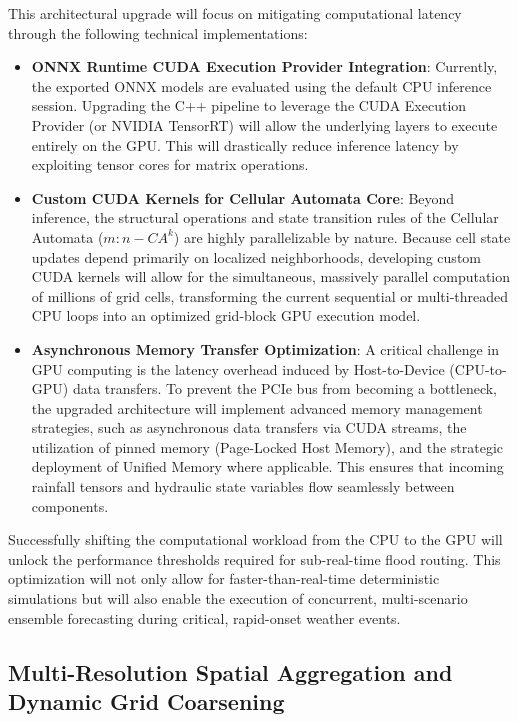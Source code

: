 This architectural upgrade will focus on mitigating computational latency through the following technical implementations:

\begin{itemize}
	\item \textbf{ONNX Runtime CUDA Execution Provider Integration}: Currently, the exported ONNX models are evaluated using 
	the default CPU inference session. Upgrading the C++ pipeline to leverage the CUDA Execution Provider (or NVIDIA TensorRT) 
	will allow the underlying layers to execute entirely on the GPU. This will drastically reduce inference latency by exploiting 
	tensor cores for matrix operations.
	
	\item \textbf{Custom CUDA Kernels for Cellular Automata Core}: Beyond inference, the structural operations and state transition 
	rules of the Cellular Automata ($m:n-CA^k$) are highly parallelizable by nature. Because cell state updates depend primarily on 
	localized neighborhoods, developing custom CUDA kernels will allow for the simultaneous, massively parallel computation of millions 
	of grid cells, transforming the current sequential or multi-threaded CPU loops into an optimized grid-block GPU execution model.
	
	\item \textbf{Asynchronous Memory Transfer Optimization}: A critical challenge in GPU computing is the latency overhead induced 
	by Host-to-Device (CPU-to-GPU) data transfers. To prevent the PCIe bus from becoming a bottleneck, the upgraded architecture 
	will implement advanced memory management strategies, such as asynchronous data transfers via CUDA streams, the utilization of 
	pinned memory (Page-Locked Host Memory), and the strategic deployment of Unified Memory where applicable. This ensures that 
	incoming rainfall tensors and hydraulic state variables flow seamlessly between components.
\end{itemize}

Successfully shifting the computational workload from the CPU to the GPU will unlock the performance thresholds required for 
sub-real-time flood routing. This optimization will not only allow for faster-than-real-time deterministic simulations but will 
also enable the execution of concurrent, multi-scenario ensemble forecasting during critical, rapid-onset weather events.


\subsection{Multi-Resolution Spatial Aggregation and Dynamic Grid Coarsening}

